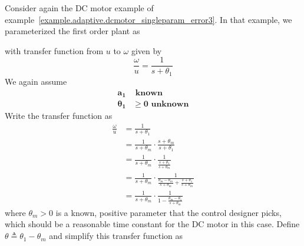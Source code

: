\begin{example}\label{example.adaptive.dcmotor_singleparam_error1}
  Consider again the DC motor example of example~\ref{example.adaptive.dcmotor_singleparam_error3}.
  In that example, we parameterized the first order plant as
  \begin{center}
  \end{center}
  with transfer function from $u$ to $\omega$ given by
  \begin{equation*}
    \frac{\omega}{u}=\frac{1}{s+\theta_{1}}
  \end{equation*}
  We again assume
  \begin{align*}
    \boldsymbol{a_{1}}&\textbf{~known} \\
    \boldsymbol{\theta_{1}}&\boldsymbol{\geq0}\textbf{~unknown}
  \end{align*}
  Write the transfer function as
  \begin{align*}
    \frac{\omega}{u}&=\frac{1}{s+\theta_{1}} \\
    &=\frac{1}{s+\theta_{m}}\cdot\frac{s+\theta_{m}}{s+\theta_{1}} \\
    &=\frac{1}{s+\theta_{m}}\cdot\frac{1}{\frac{s+\theta_{1}}{s+\theta_{m}}} \\
    &=\frac{1}{s+\theta_{m}}\cdot\frac{1}{\frac{\theta_{m}-\theta_{m}}{s+\theta_{m}}+\frac{s+\theta_{1}}{s+\theta_{m}}} \\
    &=\frac{1}{s+\theta_{m}}\cdot\frac{1}{1-\frac{\theta_{m}-\theta_{1}}{s+\theta_{m}}}
  \end{align*}
  where $\theta_{m}>0$ is a known, positive parameter that the control designer picks, which should be a reasonable time constant for the DC motor in this case.
  Define $\theta\triangleq\theta_{1}-\theta_{m}$ and simplify this transfer function as

\end{example}
